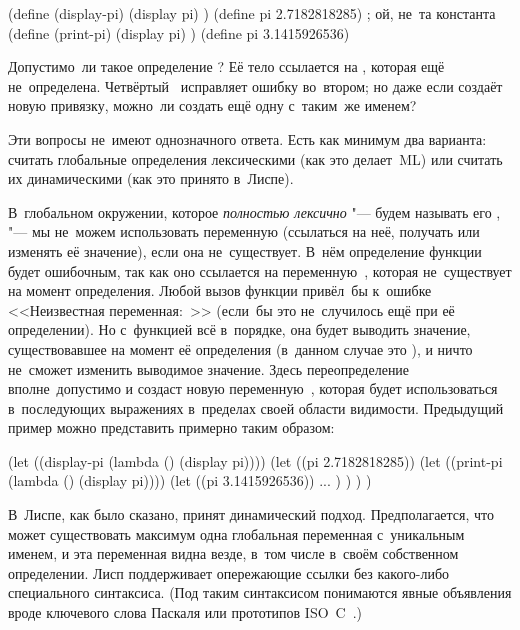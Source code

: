 \begin{code:lisp}[label=lisp1-2-omega/recusion/simple/code:redefine]
(define (display-pi)
  (display pi) )
(define pi 2.7182818285)    ; ой, не~та константа
(define (print-pi)
  (display pi) )
(define pi 3.1415926536)
\end{code:lisp}

Допустимо~ли такое определение ? Её тело ссылается на ,
которая ещё не~определена. Четвёртый~ исправляет ошибку во~втором; но
даже если  создаёт новую привязку, можно~ли создать ещё одну
с~таким~же именем?

Эти вопросы не~имеют однозначного ответа. Есть как минимум два варианта: считать
глобальные определения лексическими (как это делает~ML) или считать их
динамическими (как это принято в~Лиспе).

В~глобальном окружении, которое \emph{полностью лексично} "--- будем называть
его , "--- мы не~можем использовать переменную (ссылаться
на неё, получать или изменять её значение), если она не~существует. В~нём
определение функции  будет ошибочным, так как оно ссылается на
переменную~, которая не~существует на момент определения. Любой вызов
функции  привёл~бы к~ошибке <<Неизвестная переменная:~>>
(если~бы это не~случилось ещё при её определении). Но с~функцией 
всё в~порядке, она будет выводить значение, существовавшее на момент её
определения (в~данном случае это ), и ничто не~сможет изменить
выводимое значение. Здесь переопределение~ вполне~допустимо и создаст
новую переменную~, которая будет использоваться в~последующих выражениях
в~пределах своей области видимости. Предыдущий пример можно представить примерно
таким образом:

\begin{code:lisp}
(let ((display-pi (lambda () (display pi))))
  (let ((pi 2.7182818285))
    (let ((print-pi (lambda () (display pi))))
      (let ((pi 3.1415926536))
        ... ) ) ) )
\end{code:lisp}

В~Лиспе, как было сказано, принят динамический подход. Предполагается, что может
существовать максимум одна глобальная переменная с~уникальным именем, и эта
переменная видна везде, в~том числе в~своём собственном определении. Лисп
поддерживает опережающие ссылки без какого-либо специального синтаксиса. (Под
таким синтаксисом понимаются явные объявления вроде ключевого слова 
Паскаля или прототипов ISO~C~\cite{iso90}.)

